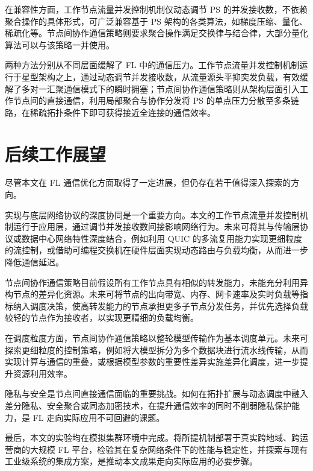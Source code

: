 \documentclass[master, vlined]{DissertUESTC}
\begin{document}
	在兼容性方面，工作节点流量并发控制机制仅动态调节 PS 的并发接收数，不依赖聚合操作的具体形式，可广泛兼容基于 PS 架构的各类算法，如梯度压缩、量化、稀疏化等。节点间协作通信策略则要求聚合操作满足交换律与结合律，大部分量化算法可以与该策略一并使用。

	两种方法分别从不同层面缓解了 FL 中的通信压力。工作节点流量并发控制机制运行于星型架构之上，通过动态调节并发接收数，从流量源头平抑突发负载，有效缓解了多对一汇聚通信模式下的瞬时拥塞；节点间协作通信策略则从架构层面引入工作节点间的直接通信，利用局部聚合与协作分发将 PS 的单点压力分散至多条链路，在稀疏拓扑条件下即可获得接近全连接的通信效率。

	\section{后续工作展望}

	尽管本文在 FL 通信优化方面取得了一定进展，但仍存在若干值得深入探索的方向。

	实现与底层网络协议的深度协同是一个重要方向。本文的工作节点流量并发控制机制运行于应用层，通过调节并发接收数间接影响网络行为。未来可将其与传输层协议或数据中心网络特性深度结合，例如利用 QUIC 的多流复用能力实现更细粒度的流控制，或借助可编程交换机在硬件层面实现动态路由与负载均衡，从而进一步降低通信延迟。

	节点间协作通信策略目前假设所有工作节点具有相似的转发能力，未能充分利用异构节点的差异化资源。未来可将节点的出向带宽、内存、网卡速率及实时负载等指标纳入调度决策，使高转发能力的节点承担更多子节点分发任务，并优先选择负载较轻的节点作为接收者，以实现更精细的负载均衡。

	在调度粒度方面，节点间协作通信策略以整轮模型传输作为基本调度单元。未来可探索更细粒度的控制策略，例如将大模型拆分为多个数据块进行流水线传输，从而实现计算与通信的重叠，或根据模型参数的重要性差异实施差异化调度，进一步提升资源利用效率。

	隐私与安全是节点间直接通信面临的重要挑战。如何在拓扑扩展与动态调度中融入差分隐私、安全聚合或同态加密技术，在提升通信效率的同时不削弱隐私保护能力，是 FL 走向实际应用不可回避的课题。

	最后，本文的实验均在模拟集群环境中完成。将所提机制部署于真实跨地域、跨运营商的大规模 FL 平台，检验其在复杂网络条件下的性能与稳定性，并探索与现有工业级系统的集成方案，是推动本文成果走向实际应用的必要步骤。

	

	\achievement
	
	\appendix
	
\end{document}

